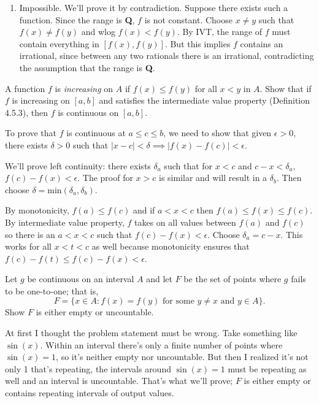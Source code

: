 \documentclass{oxmathproblems}
\begin{document}
\begin{questions}
\begin{solution}
\begin{enumerate}[label=(\alph*)]
    With bounded interval: $\tan^2{x}$ is continuous on $(\frac{\pi}{2}, \frac{\pi}{2})$ with range $[0, \infty)$.

    \item Impossible. We'll prove it by contradiction. Suppose there exists such a function. Since the range is \textbf{Q}, $f$ is not constant. 
    Choose $x \neq y$ such that $f(x) \neq f(y)$ and wlog $f(x) < f(y)$.
    By IVT, the range of $f$ must contain everything in $[f(x), f(y)]$. But this implies $f$ contains an
    irrational, since between any two rationals there is an irrational, contradicting the assumption that the range is \textbf{Q}.
  \end{enumerate}
\end{solution}

\miquestion A function $f$ is \textit{increasing} on $A$ if $f(x) \leq f(y)$ for all $x < y$ in $A$. Show that if $f$ is increasing on $[a, b]$ and satisfies the
intermediate value property (Definition 4.5.3), then $f$ is continuous on $[a, b]$.
\begin{solution}
  To prove that $f$ is continuous at $a \leq c \leq b$, we need to show that given $\epsilon > 0$, there exists $\delta > 0$ such that $|x-c| < \delta \implies |f(x)-f(c)| < \epsilon$.

  We'll prove left continuity: there exists $\delta_{a}$ such that for $x < c$ and $c-x < \delta_{a}$, $f(c)-f(x) < \epsilon$. The proof for $x > c$ is similar and will result in a $\delta_{b}$. Then
  choose $\delta=\text{min}(\delta_{a}, \delta_{b})$.

  By monotonicity, $f(a) \leq f(c)$ and if $a < x < c$ then $f(a) \leq f(x) \leq f(c)$. By intermediate value property, $f$ takes on all values between $f(a)$ and $f(c)$ so there is an $a < x < c$
  such that $f(c)-f(x) < \epsilon$. Choose $\delta_{a} = c-x$.
  This works for all $x < t < c$ as well because monotonicity ensures that $f(c)-f(t) \leq f(c)-f(x) < \epsilon$.
\end{solution}

\miquestion Let $g$ be continuous on an interval $A$ and let $F$ be the set of points where $g$ fails to be one-to-one; that is,
\[F = \{x \in A : f(x)=f(y) \text{ for some } y \neq x \text{ and } y \in A\}.\]
Show $F$ is either empty or uncountable.

\begin{solution}
  At first I thought the problem statement must be wrong. Take something like $\sin(x)$. Within an interval there's only a finite number of points where $\sin(x)=1$, so it's neither empty nor uncountable. But then I realized
  it's not only 1 that's repeating, the intervals around $\sin(x)=1$ must be repeating as well and an interval is uncountable. That's what we'll prove; $F$ is either empty or contains repeating intervals of output values.


\end{solution}
\end{questions}
\end{document}

